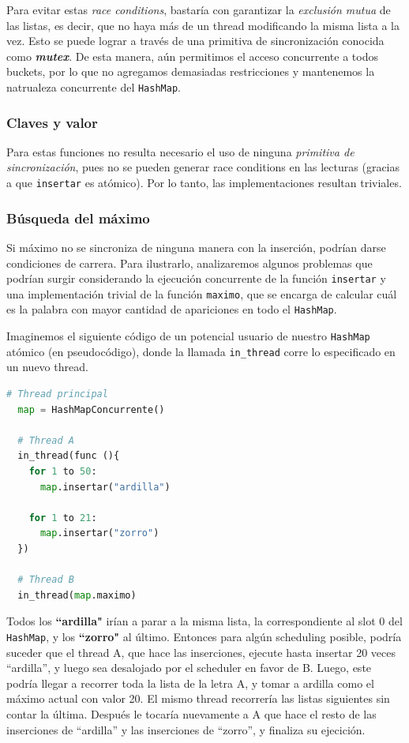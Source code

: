 \documentclass[a4paper]{article}
\begin{document}
Para evitar estas \textit{race conditions}, bastaría con garantizar la \textit{exclusión mutua} de las listas, es decir, que no haya más de un thread modificando la misma lista a la vez. Esto se puede lograr a través de una primitiva de sincronización conocida como \textbf{\textit{mutex}}. De esta manera, aún permitimos el acceso concurrente a todos buckets, por lo que no agregamos demasiadas restricciones y mantenemos la natrualeza concurrente del \texttt{HashMap}.

\subsubsection{Claves y valor}

Para estas funciones no resulta necesario el uso de ninguna \textit{primitiva de sincronización}, pues no se pueden generar race conditions en las lecturas (gracias a que \texttt{insertar} es atómico). Por lo tanto, las implementaciones resultan triviales.

\subsubsection{Búsqueda del máximo}

Si máximo no se sincroniza de ninguna manera con la inserción, podrían darse condiciones de carrera. Para ilustrarlo, analizaremos algunos problemas que podrían surgir considerando la ejecución concurrente de la función \texttt{insertar} y una implementación trivial de la función \texttt{maximo}, que se encarga de calcular cuál es la palabra con mayor cantidad de apariciones en todo el \texttt{HashMap}.

Imaginemos el siguiente código de un potencial usuario de nuestro \texttt{HashMap} atómico (en pseudocódigo), donde la llamada \texttt{in_thread} corre lo especificado en un nuevo thread.
\newpage
\begin{lstlisting}[language=python, caption=Programa naive]
  # Thread principal
  map = HashMapConcurrente()

  # Thread A
  in_thread(func (){
    for 1 to 50:
      map.insertar("ardilla")
  
    for 1 to 21:
      map.insertar("zorro")
  })
  
  # Thread B
  in_thread(map.maximo)
\end{lstlisting}

Todos los \textbf{``ardilla"} irían a parar a la misma lista, la correspondiente al slot 0 del \texttt{HashMap}, y los \textbf{``zorro"} al último. Entonces para algún scheduling posible, podría suceder que el thread A, que hace las inserciones, ejecute hasta insertar 20 veces ``ardilla'', y luego sea desalojado por el scheduler en favor de B. Luego, este podría llegar a recorrer toda la lista de la letra A, y tomar a ardilla como el máximo actual con valor 20. El mismo thread recorrería las listas siguientes sin contar la última. Después le tocaría nuevamente a A que hace el resto de las inserciones de 
``ardilla'' y las inserciones de 
``zorro'', y finaliza su ejecición.
\end{document}
